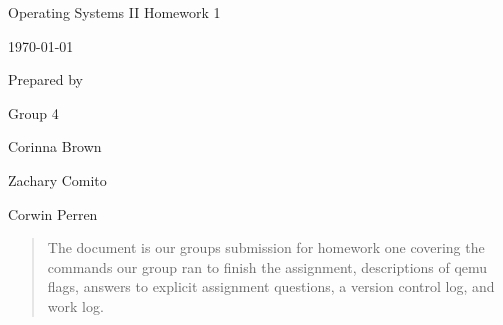 \documentclass[onecolumn, draftclsnofoot, 10pt, compsoc]{IEEEtran}
\newcommand{\NameSigPair}[1]{
  \par
  \makebox[2.75in][r]{#1} 
  \hfill
  \makebox[3.25in]{
      \makebox[2.25in]{\hrulefill} 
      \hfill
      \makebox[.75in]{\hrulefill}
  }
  \par\vspace{-12pt} 
  \textit{
      \tiny\noindent
      \makebox[2.75in]{} 
      \hfill
      \makebox[3.25in]{
          \makebox[2.25in][r]{Signature} 
          \hfill
          \makebox[.75in][r]{Date}
      }
  }
}
\renewcommand{\NameSigPair}[1]{#1}
\begin{document}
\begin{titlepage}
	\begin{singlespace}
		\par\vspace{2in}
		\centering
		\scshape{
			\huge Operating Systems II Homework 1 \par
			{\large\today}\par
			\vspace{.5in}
			\vfill
			\vspace{5pt}
			{\large Prepared by }\par
			Group 4 \par
			\vspace{5pt}
			{\Large
				\NameSigPair{Corinna Brown}\par
				\NameSigPair{Zachary Comito}\par
				\NameSigPair{Corwin Perren}\par
			}
			\vspace{20pt}
            \begin{abstract}
            The document is our groups submission for homework one covering the commands our group ran to finish the assignment, descriptions of qemu flags, answers to explicit assignment questions, a version control log, and work log.


			\end{abstract}
		}
	\end{singlespace}
\end{titlepage}
\newpage
{}
\tableofcontents
\clearpage






\end{document}
